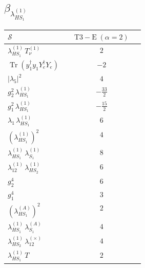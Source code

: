 \documentclass[9pt]{article}
\begin{document}
\subsection*{$ \beta_{\lambda_{HS_1}^{(1)}} $}
\begin{longtable}{@{}p{0.31\linewidth}c@{}}
\toprule
$\mathcal{S}$ & $ \mathrm{T3-E}\;(\alpha=2) $ \\
\midrule
$ \lambda_{HS_1}^{(1)}\,T_{\nu}^{(1)} $ & $ 2 $ \\
$ \operatorname{Tr}(y_1^\dagger y_1Y_e^\dagger Y_e) $ & $ -2 $ \\
$ |\lambda_5|^2 $ & $ 4 $ \\
$ g_2^2\,\lambda_{HS_1}^{(1)} $ & $ - \frac{33}{2} $ \\
$ g_1^2\,\lambda_{HS_1}^{(1)} $ & $ - \frac{15}{2} $ \\
$ \lambda_1\,\lambda_{HS_1}^{(1)} $ & $ 6 $ \\
$ \left(\lambda_{HS_1}^{(1)}\right)^2 $ & $ 4 $ \\
$ \lambda_{HS_1}^{(1)}\,\lambda_{S_1}^{(1)} $ & $ 8 $ \\
$ \lambda_{12}^{(1)}\,\lambda_{HS_2}^{(1)} $ & $ 6 $ \\
$ g_2^4 $ & $ 6 $ \\
$ g_1^4 $ & $ 3 $ \\
$ \left(\lambda_{HS_1}^{(A)}\right)^2 $ & $ 2 $ \\
$ \lambda_{HS_1}^{(1)}\,\lambda_{S_1}^{(A)} $ & $ 4 $ \\
$ \lambda_{HS_2}^{(1)}\,\lambda_{12}^{(\times)} $ & $ 4 $ \\
$ \lambda_{HS_1}^{(1)}\,T $ & $ 2 $ \\
\bottomrule
\end{longtable}
\end{document}
